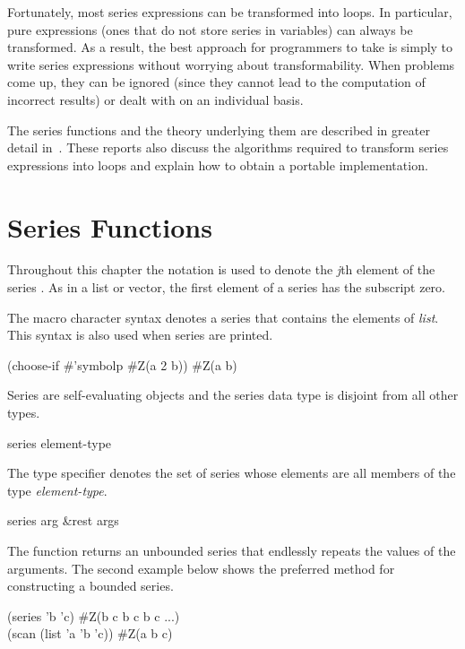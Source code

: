 Fortunately, most series expressions can be transformed into loops.  In
particular, pure expressions (ones that do not store series in variables)
can always be transformed.  As a result, the best approach for programmers
to take is simply to write series expressions without worrying about
transformability.  When problems come up, they can be ignored (since they
cannot lead to the computation of incorrect results) or dealt with on an
individual basis.

\beforenoterule
\begin{implementation}
The series functions and the theory
underlying them are described in greater detail
in~\cite{WATERS-SERIES-DESIGN,WATERS-SERIES-IMPLEMENTATION}.
These reports also discuss the algorithms required to transform series
expressions into loops and explain how to obtain a portable implementation.
\end{implementation}
\afternoterule

\section{Series Functions}
\label{SERIES-F-SECTION}

Throughout this chapter the notation  is used to
denote the \emph{j\/}th element of the series .  As in a list or
vector, the first element of a series has the subscript zero.

The \cd{\#} macro character syntax  denotes a series that contains
the elements of \emph{list}.  This syntax is also used when series are printed.
\begin{lisp}
(choose-if \#'symbolp \#Z(a 2 b)) {\EV} \#Z(a b)
\end{lisp}
Series are self-evaluating objects and the series data type is disjoint
from all other types.


\begin{defun}
series element-type

The type specifier 
denotes the set of series whose elements are all
members of the type \emph{element-type}.
\end{defun}


\begin{defun}[Function]
series arg &rest args

The function  returns an unbounded series that endlessly repeats the
values of the arguments.  The second example below shows the preferred
method for constructing a bounded series.
\begin{lisp}
(series 'b 'c) {\EV} \#Z(b c b c b c ...) \\
(scan (list 'a 'b 'c)) {\EV} \#Z(a b c)
\end{lisp}
\end{defun}

